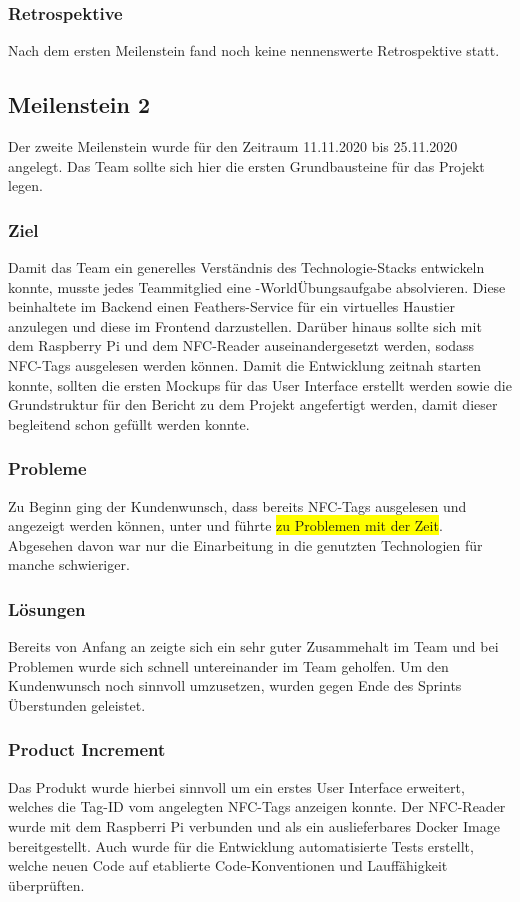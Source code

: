 \documentclass[10pt, a4paper, draft]{article}
\begin{document}
\subsubsection{Retrospektive}
Nach dem ersten Meilenstein fand noch keine nennenswerte Retrospektive statt.

\subsection{Meilenstein 2}
Der zweite Meilenstein wurde für den Zeitraum 11.11.2020 bis 25.11.2020 angelegt.
Das Team sollte sich hier die ersten Grundbausteine für das Projekt legen.
\subsubsection{Ziel}
Damit das Team ein generelles Verständnis des Technologie-Stacks entwickeln konnte, musste jedes Teammitglied eine \glqqHello-World\grqq Übungsaufgabe absolvieren. Diese beinhaltete im Backend einen Feathers-Service für ein virtuelles Haustier anzulegen und diese im Frontend darzustellen.
Darüber hinaus sollte sich mit dem Raspberry Pi und dem NFC-Reader auseinandergesetzt werden, sodass NFC-Tags ausgelesen werden können.
Damit die Entwicklung zeitnah starten konnte, sollten die ersten Mockups für das User Interface erstellt werden sowie die Grundstruktur für den Bericht zu dem Projekt angefertigt werden, damit dieser begleitend schon gefüllt werden konnte.
\subsubsection{Probleme}
Zu Beginn ging der Kundenwunsch, dass bereits NFC-Tags ausgelesen und angezeigt werden können, unter und führte \colorbox{yellow}{zu Problemen mit der Zeit}.
Abgesehen davon war nur die Einarbeitung in die genutzten Technologien für manche schwieriger.
\subsubsection{Lösungen}
Bereits von Anfang an zeigte sich ein sehr guter Zusammehalt im Team und bei Problemen wurde sich schnell untereinander im Team geholfen.
Um den Kundenwunsch noch sinnvoll umzusetzen, wurden gegen Ende des Sprints Überstunden geleistet.
\subsubsection{Product Increment}
Das Produkt wurde hierbei sinnvoll um ein erstes User Interface erweitert, welches die Tag-ID vom angelegten NFC-Tags anzeigen konnte.
Der NFC-Reader wurde mit dem Raspberri Pi verbunden und als ein auslieferbares Docker Image bereitgestellt.
Auch wurde für die Entwicklung automatisierte Tests erstellt, welche neuen Code auf etablierte Code-Konventionen und Lauffähigkeit überprüften.
\end{document}
